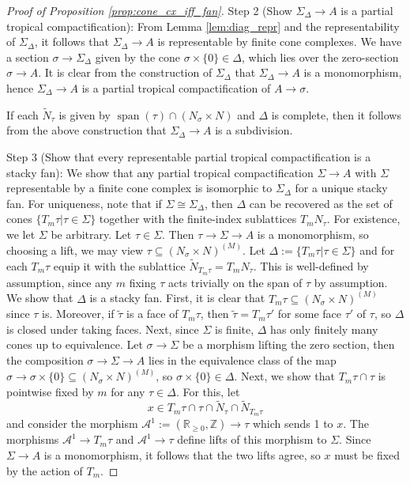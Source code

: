 \documentclass[10pt,a4paper]{amsart}
\DeclareMathOperator{\Span}{span}
\begin{document}
\begin{proof}[Proof of Proposition \ref{prop:cone_cx_iff_fan}]
	Step 2 (Show $\Sigma_{\Delta}\to A$ is a partial tropical compactification): From Lemma \ref{lem:diag_repr} and the representability of $\Sigma_{\Delta}$, it follows that $\Sigma_{\Delta}\to A$
	is representable by finite cone complexes. We have a section $\sigma\to \Sigma_{\Delta}$ given by the cone $\sigma\times\{0\}\in \Delta$,
	which lies over the zero-section $\sigma\to A$. It is clear from the construction of $\Sigma_{\Delta}$ that $\Sigma_{\Delta}\to A$
	is a monomorphism, hence $\Sigma_{\Delta}\to A$ is a partial tropical compactification of $A\to \sigma$.

	If each $\tilde{N}_{\tau}$ is given by $\Span(\tau)\cap (N_{\sigma}\times N)$ and $\Delta$ is complete, then it follows from the
	above construction that $\Sigma_{\Delta}\to A$ is a subdivision.

	Step 3 (Show that every representable partial tropical compactification is a stacky fan): We show that any partial tropical compactification $\Sigma\to A$ with $\Sigma$ representable by a finite cone complex is isomorphic
	to $\Sigma_{\Delta}$ for a unique stacky fan. For uniqueness, note that if $\Sigma\cong \Sigma_{\Delta}$, then $\Delta$
	can be recovered as the set of cones $\{T_m\tau|\tau\in \Sigma\}$ together with the finite-index sublattices
	$T_m N_{\tau}$. For existence, we let $\Sigma$ be arbitrary. Let $\tau\in \Sigma$. Then $\tau\to \Sigma\to A$ is a monomorphism,
	so choosing a lift, we may view $\tau\subseteq(N_{\sigma}\times N)^{(M)}$. Let $\Delta:=\{T_m\tau|\tau\in \Sigma\}$
	and for each $T_m\tau$ equip it with the sublattice $\tilde{N}_{T_m \tau}=T_m N_{\tau}$. This is well-defined by assumption, since any
	$m$ fixing $\tau$ acts trivially on the span of $\tau$ by assumption. We show that $\Delta$ is a stacky
	fan. First, it is clear that $T_m \tau\subseteq (N_{\sigma}\times N)^{(M)}$ since $\tau$ is. Moreover, if $\tilde{\tau}$ is a
	face of $T_m \tau$, then $\tilde{\tau}=T_m \tau'$ for some face $\tau'$ of $\tau$, so $\Delta$ is closed under taking faces. Next,
	since $\Sigma$ is finite, $\Delta$ has only finitely many cones up to equivalence. Let $\sigma\to \Sigma$ be a morphism lifting
	the zero section, then the composition $\sigma\to \Sigma\to A$ lies in the equivalence class of the map $\sigma\to \sigma\times \{0\}\subseteq (N_{\sigma}\times N)^{(M)}$,
	so $\sigma\times\{0\}\in \Delta$. Next, we show that $T_{m}\tau\cap \tau$ is pointwise fixed by $m$ for any $\tau\in \Delta$.
	For this, let
	$$x\in T_m\tau\cap\tau\cap \tilde{N}_{\tau}\cap \tilde{N}_{T_m\tau}$$
	and consider the morphism $\mathcal{A}^{1}:=(\mathbb{R}_{\ge 0},\mathbb{Z})\to \tau$
	which sends 1 to $x$. The morphisms $\mathcal{A}^{1}\to T_m\tau$ and $\mathcal{A}^{1}\to \tau$ define lifts of this morphism
	to $\Sigma$. Since $\Sigma\to A$ is a monomorphism, it follows that the two lifts agree, so $x$ must be fixed by the action of $T_m$.


\end{proof}
\end{document}
